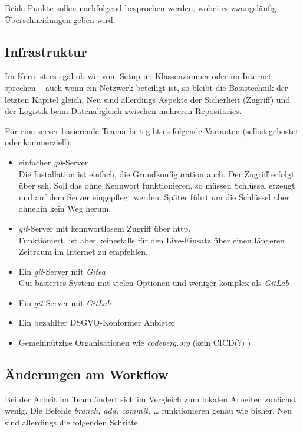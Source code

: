 \documentclass[
  ngerman,
  letterpaper,
  DIV=11]{scrreprt}
\newcommand{\git}{\textit{git}\xspace}
\begin{document}
Beide Punkte sollen nachfolgend besprochen werden, wobei es zwangsläufig
Überschneidungen geben wird.

\subsection{Infrastruktur}\label{infrastruktur}

Im Kern ist es egal ob wir vom Setup im Klassenzimmer oder im Internet
sprechen -- auch wenn ein Netzwerk beteiligt ist, so bleibt die
Basistechnik der letzten Kapitel gleich. Neu sind allerdings Aspekte der
Sicherheit (Zugriff) und der Logistik beim Datenabgleich zwischen
mehreren Repositories.

Für eine server-basierende Teamarbeit gibt es folgende Varianten (selbst
gehostet oder kommerziell):

\begin{itemize}
\item
  einfacher \git-Server\\
  Die Installation ist einfach, die Grundkonfiguration auch. Der Zugriff
  erfolgt über ssh. Soll das ohne Kennwort funktionieren, so müssen
  Schlüssel erzeugt und auf dem Server eingepflegt werden. Später führt
  um die Schlüssel aber ohnehin kein Weg herum.
\item
  \git-Server mit kennwortlosem Zugriff über http.\\
  Funktioniert, ist aber keinesfalls für den Live-Einsatz über einen
  längeren Zeitraum im Internet zu empfehlen.
\item
  Ein \git-Server mit \emph{Gitea}\\
  Gui-basiertes System mit vielen Optionen und weniger komplex als
  \emph{GitLab}
\item
  Ein \git-Server mit \emph{GitLab}
\item
  Ein bezahlter DSGVO-Konformer Anbieter
\item
  Gemeinnützige Organisationen wie \emph{codeberg.org} (kein CICD(?) )
\end{itemize}

\subsection{Änderungen am Workflow}\label{uxe4nderungen-am-workflow}

Bei der Arbeit im Team ändert sich im Vergleich zum lokalen Arbeiten
zunächst wenig. Die Befehle \emph{branch, add, commit, \ldots{}}
funktionieren genau wie bisher. Neu sind allerdings die folgenden
Schritte
\end{document}
